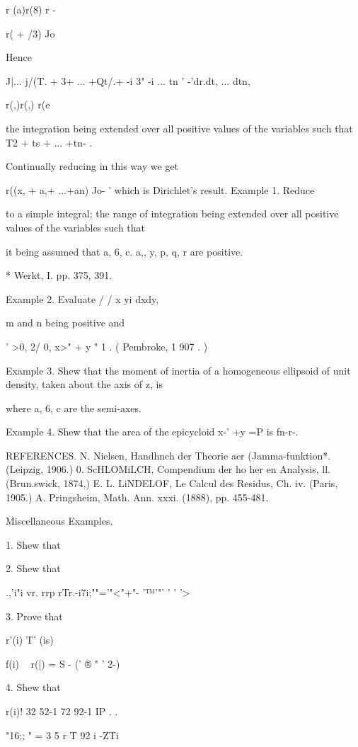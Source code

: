 r (a)r(8) r -

r( + /3) Jo

Hence

  J|... j/(T. + 3+ ... +Qt/.+ -i 3" -i ... tn ' -'dr.dt, ... dtn,

r(,)r(,) r(e

the integration being extended over all positive values of the
variables such that T2 + ts + ... +tn- .

Continually reducing in this way we get

r((x, + a,+ ...+an) Jo- ' which is Dirichlet's result. Example 1.
Reduce

to a simple integral; the range of integration being extended over
all positive values of the variables such that

it being assumed that a, 6, c. a,, y, p, q, r are positive.

* Werkt, I. pp. 375, 391.

%
%

Example 2. Evaluate / / x yi dxdy,

m and n being positive and

' >0, 2/ 0, x>" + y " 1 . ( Pembroke, 1 907 . )

Example 3. Shew that the moment of inertia of a homogeneous ellipsoid
of unit density, taken about the axis of z, is

where a, 6, c are the semi-axes.

Example 4. Shew that the area of the epicycloid x-' +y =P is fn-r-.

REFERENCES. N. Nielsen, Handhnch der Theorie aer (Jamma-funktion*.
(Leipzig, 1906.) 0. ScHLOMiLCH, Compendium der ho her en Analysis, ll.
(Brun.swick, 1874,) E. L. LiNDELOF, Le Calcul des Residus, Ch. iv.
(Paris, 1905.) A. Pringsheim, Math. Ann. xxxi. (1888), pp. 455-481.

Miscellaneous Examples.

1. Shew that


2. Shew that

.,'i"i vr. rrp rTr.-i7i;""='"<"+"- '™'"' ' ' '>

3. Prove that

r'(i) T' (is)

f(i) ~ r(|) = S - (' ® " ' 2-)

4. Shew that

 r(i)! 32 52-1 72 92-1 IP . .

"16;; " = 3  5  r T  92  i -ZTi  

